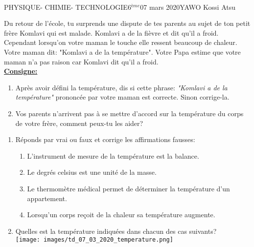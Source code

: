 \documentclass[12pt,a4paper]{book}
\newcommand{\prof}{YAWO Kossi Atsu}
\newcommand{\matiere}{\\PHYSIQUE- CHIMIE- TECHNOLOGIE}
\newcommand{\classe}{6$^{ème}$}
\begin{document}
\begin{td}{\matiere}{\classe}{07 mars 2020}{\prof}
\begin{exo}
Du retour de l'école, tu surprends une dispute de tes parents au sujet de ton petit frère Komlavi qui est malade. Komlavi a de la fièvre et dit qu'il a froid. Cependant lorsqu'on votre maman le touche elle ressent beaucoup de chaleur. Votre maman dit: "Komlavi a de la température". Votre Papa estime que votre maman n'a pas raison car Komlavi dit qu'il a froid.\\

\textbf{\underline{Consigne:}}
\begin{enumerate}
\item Après avoir défini la température, dis si cette phrase: \emph{"Komlavi a de la température"} prononcée par votre maman est correcte. Sinon corrige-la.
\item Vos parents n'arrivent pas à se mettre d'accord sur la température du corps de votre frère, comment peux-tu les aider?
\end{enumerate}
\end{exo}

\vspace{0.2cm}

\begin{exo}
\setlength{\columnseprule}{1pt}
\begin{multicols}{2}
\begin{enumerate}
\item Réponds par vrai ou faux et corrige les affirmations fausses:
\begin{enumerate}
\item L'instrument de mesure de la température est la balance.
\item Le degrés celsius est une unité de la masse.
\item Le thermomètre médical permet de déterminer la température d'un appartement.
\item Lorsqu'un corps reçoit de la chaleur sa température augmente.
\end{enumerate}
\item Quelles est la température indiquées dans chacun des cas suivants?\\
\texttt{[image: images/td\_07\_03\_2020\_temperature.png]}
\end{enumerate}
\end{multicols}
\end{exo}

\vspace{0.2cm}


\end{td}
\end{document}
